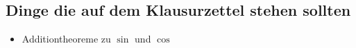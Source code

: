 \subsection{Dinge die auf dem Klausurzettel stehen sollten}
\begin{itemize}
    \item Additiontheoreme zu $\sin$ und $\cos$
\end{itemize}